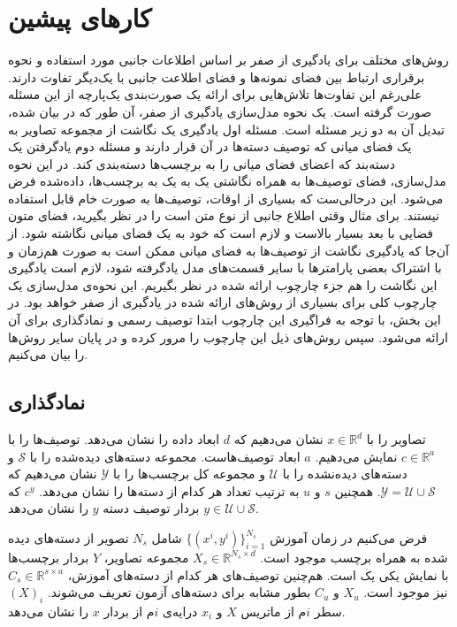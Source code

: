 \section{کارهای پیشین}\label{review}
روش‌های مختلف برای یادگیری از صفر بر اساس اطلاعات جانبی مورد استفاده و نحوه برقراری ارتباط بین فضای نمونه‌ها و فضای اطلاعت جانبی با یک‌دیگر تفاوت دارند. علی‌رغم این تفاوت‌ها تلاش‌هایی برای ارائه یک صورت‌بندی یک‌پارچه از این مسئله صورت گرفته است. یک نحوه مدل‌سازی  یادگیری از صفر، آن طور که در \cite{hinton09} بیان شده، تبدیل آن به دو زیر مسئله است. مسئله اول یادگیری یک نگاشت از مجموعه تصاویر به یک فضای میانی که توصیف دسته‌ها در آن قرار دارند و مسئله دوم یادگرفتن یک دسته‌بند که اعضای فضای میانی را به برچسب‌ها دسته‌بندی کند. در این نحوه مدل‌سازی، فضای توصیف‌ها به همراه نگاشتی یک به یک به برچسب‌ها، داده‌شده فرض می‌شود. این درحالی‌ست که بسیاری از اوقات، توصیف‌ها به صورت خام قابل استفاده نیستند. برای مثال وقتی اطلاع جانبی از نوع متن است را در نظر بگیرید، فضای متون فضایی با بعد بسیار بالاست و لازم است که خود به یک فضای میانی نگاشته شود. از آن‌جا که یادگیری نگاشت از توصیف‌ها به فضای میانی ممکن است به صورت هم‌زمان و با اشتراک بعضی پارامترها با سایر قسمت‌های مدل یادگرفته شود، لازم است یادگیری این نگاشت را هم جزء چارچوب ارائه شده در نظر بگیریم. این نحوه‌ی مدل‌سازی یک چارچوب کلی برای بسیاری از روش‌های ارائه شده در یادگیری از صفر خواهد بود. در این بخش، با توجه به فراگیری این چارچوب ابتدا توصیف رسمی و نمادگذاری برای آن ارائه می‌شود. سپس روش‌های ذیل این چارچوب را مرور کرده و در پایان سایر روش‌ها را بیان می‌کنیم. 
 
 
 \subsection{نماد‌گذاری}\label{notaion}
 تصاویر را با 
 $x \in \mathbb{R}^d$
 نشان می‌دهیم که $d$ ابعاد داده را نشان می‌دهد. توصیف‌ها را با 
 $ c \in \mathbb{R}^a$
 نمایش می‌دهیم. $a$ ابعاد توصیف‌هاست. مجموعه دسته‌های دیده‌شده را با  $ \mathcal{S}$ و دسته‌های دیده‌نشده را با $ \mathcal{U}$ و مجموعه کل برچسب‌ها را با $ \mathcal{Y}$ 
 نشان می‌دهیم که
 $ \mathcal{Y} =  \mathcal{U} \cup \mathcal{S} $.
 همچنین   $s$ و $u$ به ترتیب تعداد هر کدام از دسته‌ها را نشان می‌دهد. $c^y$ که    $ y \in \mathcal{U} \cup \mathcal{S} $ بردار توصیف دسته $y$ را نشان می‌دهد.
   
    فرض می‌کنیم در زمان آموزش $ \{ (x^i, y^i) \}_{i=1}^{N_s} $ شامل $N_s$ تصویر از دسته‌های دیده شده به همراه برچسب  موجود است. 
     $X_s \in \mathbb{R}^{N_s \times d}$
  مجموعه تصاویر، $Y$ بردار برچسب‌ها با نمایش یکی یک
   است. هم‌چنین توصیف‌های هر کدام از دسته‌های آموزش،
  $C_s \in \mathbb{R}^{s \times a}$
 نیز موجود است. $X_u$ و $C_u$ بطور مشابه برای دسته‌های آزمون تعریف می‌شوند.  $(X)_i$ سطر $i$م از ماتریس $X$ و $x_i$ درایه‌ی $i$م از بردار $x$ را نشان می‌دهد. 
 
